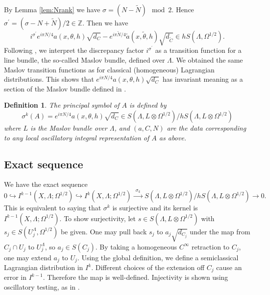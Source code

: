 \documentclass[10pt, a4paper, twoside]{amsart}
\numberwithin{equation}{section}
\newtheorem{definition}[theorem]{Definition}
\theoremstyle{remark}
\begin{document}
\begin{appendix}
	By  Lemma \ref{lem:Nrank} we have $\sigma = (N - \tilde{N})\mod 2$. Hence $\sigma^\prime = (\sigma - N + \tilde{N})/2 \in \mathbb{Z}.$ Then we have
	$$i^{\sigma^\prime} e^{i\pi N/4} a(x, \theta, h) \sqrt{d_C}  - e^{i\pi \tilde{N}/4} \tilde{a}(x, \tilde{\theta}, h) \sqrt{d_{\tilde{C}}}  \in hS(\Lambda, \Omega^{1/2}).$$ 
	Following \cite[Section 3]{Hormander-Acta-1971}, we interpret the discrepancy factor $i^{\sigma^\prime}$ as a transition function for a line bundle, the so-called Maslov bundle, defined over $\Lambda$. 
	We obtained the same Maslov transition functions as for classical (homogeneous) Lagrangian distributions. 
	This shows that $e^{i\pi N/4} a(x, \theta, h) \sqrt{d_C}$ has invariant meaning as a section of the Maslov bundle defined in \cite[Section 3]{Hormander-Acta-1971}. 
	
	\begin{definition}
	The principal symbol of $A$ is defined by 
	$$
	\sigma^k(A) = e^{ i \pi N/4} a(x, \theta, h) \sqrt{d_C} \in S(\Lambda, L \otimes \Omega^{1/2})/ h S(\Lambda, L \otimes \Omega^{1/2})
	$$
	where $L$ is the Maslov bundle over $\Lambda$, and $(a, C, N)$ are the data corresponding to any local oscillatory integral representation of $A$ as above. 
	\end{definition}
	
	
	
	
	
	\subsection{Exact sequence}
	We have the exact sequence $$0 \hookrightarrow I^{k - 1}(X, \Lambda; \Omega^{1/2}) \hookrightarrow I^k(X, \Lambda; \Omega^{1/2}) \xrightarrow{\ \ \sigma_k \ \ } S(\Lambda, L \otimes \Omega^{1/2})/ h S(\Lambda, L \otimes \Omega^{1/2}) \longrightarrow 0.$$
	This is equivalent to saying that $\sigma^k$ is surjective and its kernel is $I^{k-1}(X, \Lambda; \Omega^{1/2})$. To show surjectivity, let $s \in S(\Lambda, L \otimes \Omega^{1/2})$ with $s_j \in S (U^\Lambda_j, \Omega^{1/2})$ be given. One may pull back $s_j$ to $a_j \sqrt{d_{C_j}}$ under the map from $C_j \cap U_j$ to $U^\Lambda_j$, so $ a_j \in S(C_j)$. By taking a homogeneous $C^\infty$ retraction to $C_j$, one may extend $a_j$ to $U_j$. Using the global definition, we define a semiclassical Lagrangian distribution in $I^k$. Different choices of the extension off $C_j$ cause an error in $I^{k - 1}$. Therefore the map is well-defined.
	Injectivity is shown using oscillatory testing, as in \cite[Section 3.2]{Hormander-Acta-1971}. 
	

\end{appendix}
\end{document}
